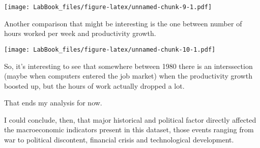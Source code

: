 \documentclass[]{article}
\newenvironment{Shaded}{\begin{snugshade}}{\end{snugshade}}
\newcommand{\KeywordTok}[1]{\textcolor[rgb]{0.13,0.29,0.53}{\textbf{#1}}}
\newcommand{\DataTypeTok}[1]{\textcolor[rgb]{0.13,0.29,0.53}{#1}}
\newcommand{\DecValTok}[1]{\textcolor[rgb]{0.00,0.00,0.81}{#1}}
\newcommand{\FloatTok}[1]{\textcolor[rgb]{0.00,0.00,0.81}{#1}}
\newcommand{\StringTok}[1]{\textcolor[rgb]{0.31,0.60,0.02}{#1}}
\newcommand{\OperatorTok}[1]{\textcolor[rgb]{0.81,0.36,0.00}{\textbf{#1}}}
\newcommand{\NormalTok}[1]{#1}
\begin{document}
\texttt{[image: LabBook\_files/figure-latex/unnamed-chunk-9-1.pdf]}

Another comparison that might be interesting is the one between number
of hours worked per week and productivity growth.

\begin{Shaded}
\end{Shaded}

\texttt{[image: LabBook\_files/figure-latex/unnamed-chunk-10-1.pdf]}

So, it's interesting to see that somewhere between 1980 there is an
interssection (maybe when computers entered the job market) when the
productivity growth boosted up, but the hours of work actually dropped a
lot.

That ends my analysis for now.

I could conclude, then, that major historical and political factor
directly affected the macroeconomic indicators present in this dataset,
those events ranging from war to political discontent, financial crisis
and technological development.
\end{document}
